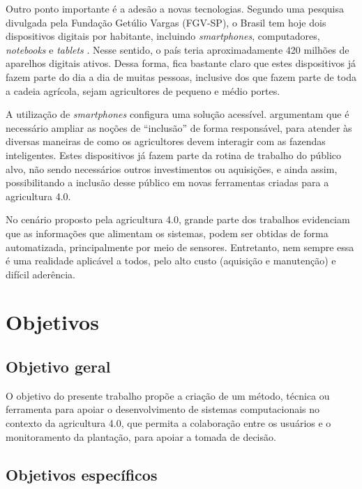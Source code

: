 \documentclass[12pt]{article}
\begin{document}
Outro ponto importante é a adesão a novas tecnologias. Segundo uma pesquisa divulgada pela Fundação Getúlio Vargas (FGV-SP), o Brasil tem hoje dois dispositivos digitais por habitante, incluindo \textit{smartphones}, computadores, \textit{notebooks} e \textit{tablets} \cite{FGV:2020}. Nesse sentido, o país teria aproximadamente 420 milhões de aparelhos digitais ativos. Dessa forma, fica bastante claro que estes dispositivos já fazem parte do dia a dia de muitas pessoas, inclusive dos que fazem parte de toda a cadeia agrícola, sejam agricultores de pequeno e médio portes.

A utilização de \textit{smartphones} configura uma solução acessível.  argumentam que é necessário ampliar as noções de ``inclusão'' de forma responsável, para atender às diversas maneiras de como os agricultores devem interagir com as fazendas inteligentes. Estes dispositivos já fazem parte da rotina de trabalho do público alvo, não sendo necessários outros investimentos ou aquisições, e ainda assim, possibilitando a inclusão desse público em novas ferramentas criadas para a agricultura 4.0.

No cenário proposto pela agricultura 4.0, grande parte dos trabalhos evidenciam que as informações que alimentam os sistemas, podem ser obtidas de forma automatizada, principalmente por meio de sensores. Entretanto, nem sempre essa é uma realidade aplicável a todos, pelo alto custo (aquisição e manutenção) e difícil aderência.

\section{Objetivos}
\label{sec:objetivos}

\subsection{Objetivo geral}
\label{subsec:objetivo_geral}

O objetivo do presente trabalho propõe a criação de um método, técnica ou ferramenta para apoiar o desenvolvimento de sistemas computacionais no contexto da agricultura 4.0, que permita a colaboração entre os usuários e o monitoramento da plantação, para apoiar a tomada de decisão.

\subsection{Objetivos específicos}
\label{subsec:objetivos_especificos}
\end{document}
